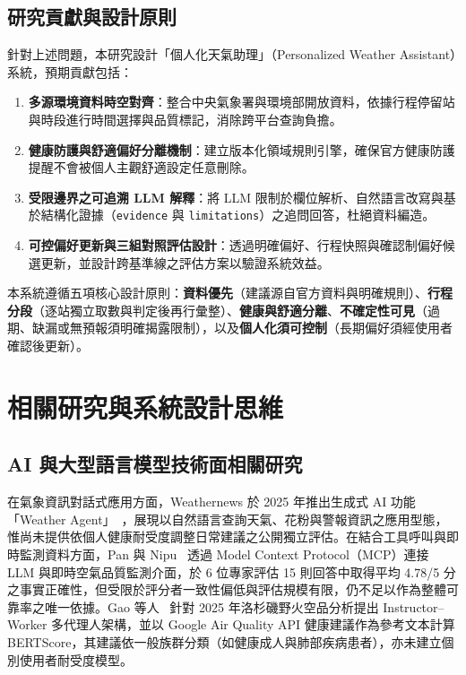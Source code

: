 \documentclass[conference]{IEEEtran}
\begin{document}
\subsection{研究貢獻與設計原則}
針對上述問題，本研究設計「個人化天氣助理」（Personalized Weather Assistant）系統，預期貢獻包括：
\begin{enumerate}
  \item \textbf{多源環境資料時空對齊}：整合中央氣象署與環境部開放資料，依據行程停留站與時段進行時間選擇與品質標記，消除跨平台查詢負擔。
  \item \textbf{健康防護與舒適偏好分離機制}：建立版本化領域規則引擎，確保官方健康防護提醒不會被個人主觀舒適設定任意刪除。
  \item \textbf{受限邊界之可追溯 LLM 解釋}：將 LLM 限制於欄位解析、自然語言改寫與基於結構化證據（\texttt{evidence} 與 \texttt{limitations}）之追問回答，杜絕資料編造。
  \item \textbf{可控偏好更新與三組對照評估設計}：透過明確偏好、行程快照與確認制偏好候選更新，並設計跨基準線之評估方案以驗證系統效益。
\end{enumerate}

本系統遵循五項核心設計原則：\textbf{資料優先}（建議源自官方資料與明確規則）、\textbf{行程分段}（逐站獨立取數與判定後再行彙整）、\textbf{健康與舒適分離}、\textbf{不確定性可見}（過期、缺漏或無預報須明確揭露限制），以及\textbf{個人化須可控制}（長期偏好須經使用者確認後更新）。

\section{相關研究與系統設計思維}

\subsection{AI 與大型語言模型技術面相關研究}
在氣象資訊對話式應用方面，Weathernews 於 2025 年推出生成式 AI 功能「Weather Agent」~\cite{weathernews2025agent}，展現以自然語言查詢天氣、花粉與警報資訊之應用型態，惟尚未提供依個人健康耐受度調整日常建議之公開獨立評估。在結合工具呼叫與即時監測資料方面，Pan 與 Nipu~\cite{pan2025mcp_aqi} 透過 Model Context Protocol（MCP）連接 LLM 與即時空氣品質監測介面，於 6 位專家評估 15 則回答中取得平均 4.78/5 分之事實正確性，但受限於評分者一致性偏低與評估規模有限，仍不足以作為整體可靠率之唯一依據。Gao 等人~\cite{gao2025instructor_worker} 針對 2025 年洛杉磯野火空品分析提出 Instructor--Worker 多代理人架構，並以 Google Air Quality API 健康建議作為參考文本計算 BERTScore，其建議依一般族群分類（如健康成人與肺部疾病患者），亦未建立個別使用者耐受度模型。
\end{document}
